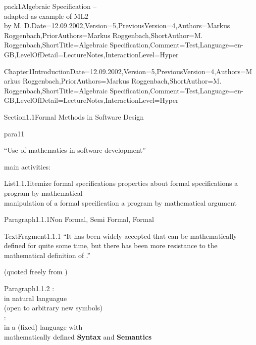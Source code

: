 \documentclass[landscape, slides, light]{mmiss2}
\begin{document}
\begin{Package}{pack1}{Algebraic
Specification -- \\ adapted as example of ML2\\ by M. D.}{Date=12.09.2002,Version=5,PreviousVersion=4,Authors={Markus
Roggenbach},PriorAuthors={Markus
Roggenbach},ShortAuthor={M. Roggenbach},ShortTitle={Algebraic Specification},Comment=Test,Language=en-GB,LevelOfDetail=LectureNotes,InteractionLevel=Hyper}

\begin{Section}{Chapter1}{Introduction}{Date=12.09.2002,Version=5,PreviousVersion=4,Authors={Markus
Roggenbach},PriorAuthors={Markus
Roggenbach},ShortAuthor={M. Roggenbach},ShortTitle={Algebraic Specification},Comment=Test,Language=en-GB,LevelOfDetail=LectureNotes,InteractionLevel=Hyper}

\begin{Section}{Section1.1}{Formal Methods in Software Design}{}
\begin{Paragraph}{para11}{}{}
\begin{center}
``Use of mathematics in software development''\\
\end{center}
main activities:
\begin{List}{List1.1.1}{itemize}{}
\ListItem{}
{ formal specifications  \pause}
\ListItem{}
{ properties about formal specifications \pause}
\ListItem{}
{ a program by mathematical \\
            manipulation of a formal specification \pause}
\ListItem{}
{ a program by mathematical argument}
\end{List}
\end{Paragraph}

\begin{Paragraph}{Paragraph1.1.1}{Non Formal, Semi Formal, Formal}{}

\begin{TextFragment}{TextFragment1.1.1}{}
``It has been widely accepted that  can be mathematically
defined for quite some time, but there has been more resistance to the
mathematical definition of .''
\end{TextFragment}

(quoted freely from \cite{bowen99})
\end{Paragraph}
\begin{Paragraph}{Paragraph1.1.2}{}{}
:\\
in natural languague \\
(open to arbitrary new symbols)\\
\newline
{}: \\
in a (fixed) language with \\
mathematically defined {\bf Syntax} and {\bf Semantics}\\


\end{Paragraph}
\end{Section}
\end{Section}
\end{Package}
\end{document}

